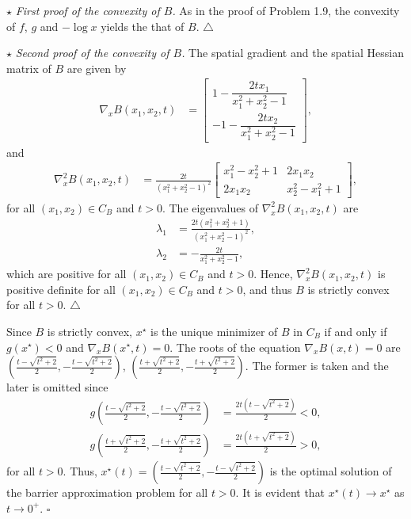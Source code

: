 \documentclass[a4paper]{article}
\numberwithin{equation}{section}
\begin{document}
\begin{enumerate}
$\star$ \textit{First proof of the convexity of $B$.} As in the proof of Problem 1.9, the convexity of $f$, $g$ and $-\log x$ yields the that of $B$. \hfill $\triangle$

$\star$ \textit{Second proof of the convexity of $B$.} The spatial gradient and the spatial Hessian matrix of $B$ are given by
\begin{align}
\nabla _x B\left( {{x_1},{x_2},t} \right) &= \left[ {\begin{array}{*{20}{c}}
{1 - \dfrac{{2t{x_1}}}{{x_1^2 + x_2^2 - 1}}}\\
{ - 1 - \dfrac{{2t{x_2}}}{{x_1^2 + x_2^2 - 1}}}
\end{array}} \right],
\end{align}
and
\begin{align}
{\nabla _x^2}B\left( {{x_1},{x_2},t} \right) &= \frac{{2t}}{{{{\left( {x_1^2 + x_2^2 - 1} \right)}^2}}}\left[ {\begin{array}{*{20}{c}}
{x_1^2 - x_2^2 + 1}&{2{x_1}{x_2}}\\
{2{x_1}{x_2}}&{x_2^2 - x_1^2 + 1}
\end{array}} \right],
\end{align}
for all $\left(x_1,x_2\right)\in C_B$ and $t>0$. The eigenvalues of ${\nabla _x^2}B\left( {{x_1},{x_2},t} \right)$ are 
\begin{align}
{\lambda _1} &= \frac{{2t\left( {x_1^2 + x_2^2 + 1} \right)}}{{{{\left( {x_1^2 + x_2^2 - 1} \right)}^2}}},\\
{\lambda _2} &=  - \frac{{2t}}{{x_1^2 + x_2^2 - 1}},
\end{align}
which are positive for all $\left(x_1,x_2\right)\in C_B$ and $t>0$. Hence, ${\nabla _x^2}B\left( {{x_1},{x_2},t} \right)$ is positive definite for all $\left(x_1,x_2\right)\in C_B$ and $t>0$, and thus $B$ is strictly convex for all $t>0$. \hfill $\triangle$

Since $B$ is strictly convex, $x^\star$ is the unique minimizer of $B$ in $C_B$ if and only if $g\left(x^\star \right)<0$ and $\nabla _x B\left( {{x^\star},t} \right) = 0$. The roots of the equation $\nabla _x B\left( {x,t} \right) = 0$ are $\left( {\frac{{t - \sqrt {{t^2} + 2} }}{2}, - \frac{{t - \sqrt {{t^2} + 2} }}{2}} \right)$, $\left( {\frac{{t + \sqrt {{t^2} + 2} }}{2}, - \frac{{t + \sqrt {{t^2} + 2} }}{2}} \right)$. The former is taken and the later is omitted since
\begin{align}
g\left( {\frac{{t - \sqrt {{t^2} + 2} }}{2}, - \frac{{t - \sqrt {{t^2} + 2} }}{2}} \right) &= \frac{{2t\left( {t - \sqrt {{t^2} + 2} } \right)}}{2} < 0,\\
g\left( {\frac{{t + \sqrt {{t^2} + 2} }}{2}, - \frac{{t + \sqrt {{t^2} + 2} }}{2}} \right) &= \frac{{2t\left( {t + \sqrt {{t^2} + 2} } \right)}}{2} > 0,
\end{align} 
for all $t>0$. Thus, ${x^\star}\left( t \right) = \left( {\frac{{t - \sqrt {{t^2} + 2} }}{2}, - \frac{{t - \sqrt {{t^2} + 2} }}{2}} \right)$ is the optimal solution of the barrier approximation problem for all $t>0$. It is evident that $x^\star \left(t\right)\to x^\star$ as $t\to 0^+$. \hfill $\square$
\end{enumerate}
\end{document}
